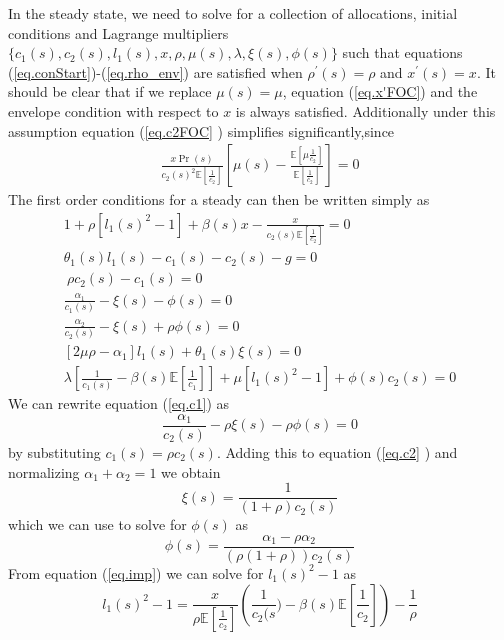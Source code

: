\documentclass[thmsb,11pt]{article}
\begin{document}
In the steady state, we need to solve for a collection of allocations, initial conditions and Lagrange multipliers $%
\{c_1(s),c_2(s),l_1(s),x,\rho,\mu(s),\lambda,\xi(s),\phi(s)\}$ such that
equations (\ref{eq.conStart})-(\ref{eq.rho_env}) are satisfied when $%
\rho^{\prime }(s) = \rho$ and $x^{\prime }(s) = x$. It should be clear that if we replace $\mu(s) = \mu$, equation (\ref{eq.x'FOC})  and the envelope condition with respect to $x$ is
always satisfied. Additionally under this assumption equation (\ref{eq.c2FOC}%
) simplifies significantly,since
\begin{align*}
\frac{x\Pr(s)}{c_2(s)^2\mathbb{E}[\frac1{c_2}]}\left[\mu(s)-\frac{\mathbb{E}%
[\mu\frac1{c_2}]}{\mathbb{E}[\frac1{c_2}]}\right] = 0
\end{align*}
The first order conditions for a
steady can then be written simply as
\begin{align}
1+\rho[l_1(s)^2-1]+\beta(s)x-\frac{x}{ c_2(s)\mathbb{E}[\frac1{c_2}]} = 0
\label{eq.imp} \\
\theta_1(s) l_1(s) - c_1(s)-c_2(s)-g=0  \label{eq.res} \\
\ \rho c_2(s)-c_1(s) = 0  \label{eq.rhoFOC} \\
\frac{\alpha_1}{c_1(s)}-\xi(s)-\phi(s) = 0  \label{eq.c1} \\
\frac{\alpha_2}{c_2(s)}-\xi(s)+\rho\phi(s) = 0  \label{eq.c2} \\
[2\mu \rho-\alpha_1]l_1(s)+\theta_1(s)\xi(s) = 0  \label{eq.l1} \\
\lambda\left[\frac1{c_1(s)}-\beta(s)\mathbb{E}[\frac1{c_1}]\right]+\mu[%
l_1(s)^2-1]+\phi(s)c_2(s) = 0  \label{eq.R}
\end{align}
We can rewrite equation (\ref{eq.c1}) as
\begin{equation*}
\frac{\alpha_1}{c_2(s)} - \rho\xi(s) -\rho\phi(s) = 0
\end{equation*}%
by substituting $c_1(s) = \rho c_2(s)$. Adding this to equation (\ref{eq.c2}%
) and normalizing $\alpha_1+\alpha_2 = 1$ we obtain
\begin{equation}
\xi(s) = \frac1{\left(1+\rho\right)c_2(s)}\label{eq.xi}
\end{equation}%
which we can use to solve for $\phi(s)$ as
\begin{equation}
\phi(s) = \frac{\alpha_1-\rho\alpha_2}{\left(\rho(1+\rho)\right)c_2(s)}
\label{eq.phi}
\end{equation}
From equation (\ref{eq.imp}) we can solve for $l_1(s)^2 -1$ as
\begin{equation*}
l_1(s)^2-1 = \frac{x}{\rho\mathbb{E}[\frac1{c_2}]}\left(\frac
{1}{c_2(s})-\beta(s)\mathbb{E}[\frac1{c_2}]\right)-\frac1\rho
\end{equation*}%
\end{document}
